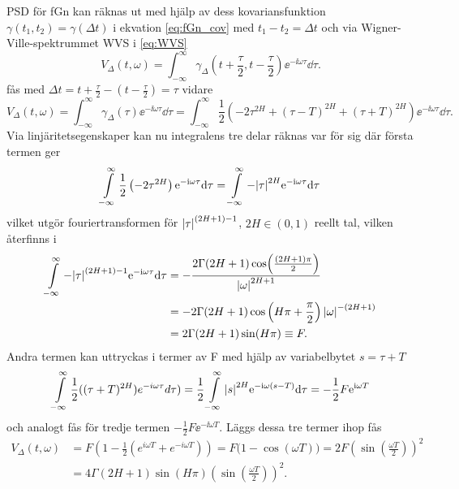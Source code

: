 PSD för fGn kan räknas ut med hjälp av dess kovariansfunktion $\gamma(t_1,t_2)=\gamma(\Delta{t})$ i ekvation \eqref{eq:fGn_cov} med $t_1-t_2=\Delta{t}$ och via Wigner-Ville-spektrummet WVS i \eqref{eq:WVS}
\begin{equation}
    V_{\Delta}(t,\omega)
    =\int^{\infty}_{-\infty} 
    \gamma_{\Delta}
    \left(
    t+\frac{\tau}{2},t-\frac{\tau}{2}
    \right) 
    \ee^{-\ii\omega\tau} \dd\tau.
\end{equation}
fås med $\Delta{t}=t+\frac{\tau}{2}-(t-\frac{\tau}{2})=\tau$ vidare
\begin{equation} \label{eq:fGn_covterm}
    V_{\Delta}(t, \omega)
    =
    \int^{\infty}_{-\infty} 
    \gamma_{\Delta}(\tau) \ee^{-\ii\omega\tau} \dd\tau 
    = 
    \int^{\infty}_{-\infty} \frac{1}{2} 
    \left(
    -2\tau^{2H} + (\tau-T)^{2H} + (\tau+T)^{2H}
    \right) 
    \ee^{-\ii\omega\tau} \dd\tau.
\end{equation}
Via linjäritetsegenskaper kan nu integralens tre delar räknas var för sig där första termen ger
\begin{equation}
    \int^{\infty}_{-\infty}
    \frac{1}{2}\left(-2\tau^{2H}\right)
    \ee^{-\ii\omega\tau} \dd\tau 
    = \int^{\infty}_{-\infty} -\abs{\tau}^{2H}\ee^{-\ii\omega\tau} \dd\tau 
\end{equation}
vilket utgör fouriertransformen för $\abs{\tau}^{(2H+1)-1}$, $2H\in (0,1)$ reellt tal, vilken återfinns i \cite{BETA}
\begin{equation}
\begin{aligned}
    \int^{\infty}_{-\infty} -\abs{\tau}^{(2H+1)-1}\ee^{-\ii\omega\tau} \dd\tau 
    &= -\frac{
    2\Gamma(2H+1)
    \cos(\frac{(2H+1)\pi}{2})}{
    \abs{\omega}^{2H+1}} 
    \\ 
    &= -2\Gamma{(2H+1)} \cos\left(H\pi+\frac{\pi}{2}\right) \abs{\omega}^{-(2H+1)} 
    \\
    &= 2\Gamma{(2H+1)}\sin(H\pi) \equiv F.
\end{aligned}
\end{equation}
Andra termen kan uttryckas i termer av F med hjälp av variabelbytet $s=\tau+T$
\begin{equation}
\int^{\infty}_{-\infty}\frac{1}{2}((\tau+T)^{2H})e^{-i\omega\tau} d\tau) 
= \frac{1}{2}\int^{\infty}_{-\infty} \abs{s}^{2H} \ee^{-\ii\omega(s-T)} \dd\tau 
= -\frac{1}{2} F \ee^{\ii\omega T} 
\end{equation}
och analogt fås för tredje termen $-\frac{1}{2}F\ee^{-\ii\omega T}$. Läggs dessa tre termer ihop fås
\begin{equation}
\begin{aligned}
    V_{\Delta}(t,\omega)
    &= F\left(1-\frac{1}{2}\left(e^{i\omega T}+e^{-i\omega T}\right)\right) 
    = F\Big( 1-\cos(\omega T) \Big) 
    = 2F\left(\sin(\frac{\omega T}{2})\right)^2 \\
    &= 
    4\Gamma{(2H+1)}
    \sin(H\pi)\left(\sin(\frac{\omega T}{2})\right)^2. \label{eq:fGn_PSD_halvklar}
\end{aligned}
\end{equation}
